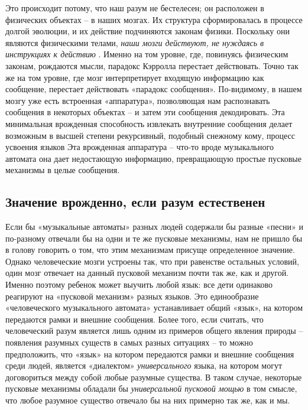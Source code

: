 \documentclass[../main.tex]{subfiles}
\begin{document}
Это происходит потому, что наш разум не бестелесен; он расположен в физических объектах \--- в наших мозгах. Их структура сформировалась в процессе долгой эволюции, и их действие подчиняются законам физики. Поскольку они являются физическими телами, \emph{наши мозги действуют, не нуждаясь в инструкциях к действию} . Именно на том уровне, где, повинуясь физическим законам, рождаются мысли, парадокс Кэрролла перестает действовать. Точно так же на том уровне, где мозг интерпретирует входящую информацию как сообщение, перестает действовать «парадокс сообщения». По-видимому, в нашем мозгу уже есть встроенная «аппаратура», позволяющая нам распознавать сообщения в некоторых объектах \--- и затем эти сообщения декодировать. Эта минимальная врожденная способность извлекать внутренние сообщения делает возможным в высшей степени рекурсивный, подобный снежному кому, процесс усвоения языков Эта врожденная аппаратура \--- что-то вроде музыкального автомата она дает недостающую информацию, превращающую простые пусковые механизмы в целые сообщения.


\subsection{Значение врожденно, если разум естественен}

Если бы «музыкальные автоматы» разных людей содержали бы разные «песни» и по-разному отвечали бы на одни и те же пусковые механизмы, нам не пришло бы в голову говорить о том, что этим механизмам присуще определенное значение. Однако человеческие мозги устроены так, что при равенстве остальных условий, один мозг отвечает на данный пусковой механизм почти так же, как и другой. Именно поэтому ребенок может выучить любой язык: все дети одинаково реагируют на «пусковой механизм» разных языков. Это единообразие «человеческого музыкального автомата» устанавливает общий «язык», на котором передаются рамки и внешние сообщения. Более того, если считать, что человеческий разум является лишь одним из примеров общего явления природы \--- появления разумных существ в самых разных ситуациях \--- то можно предположить, что «язык» на котором передаются рамки и внешние сообщения среди людей, является «диалектом» \emph{универсального} языка, на котором могут договориться между собой любые разумные существа. В таком случае, некоторые пусковые механизмы обладали бы \emph{универсальной пусковой мощью} в том смысле, что любое разумное существо отвечало бы на них примерно так же, как и мы.
\end{document}
